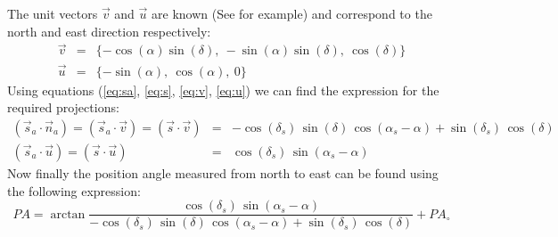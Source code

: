 The unit vectors $\vec{v}$ and $\vec{u}$ are known (See \cite{kn:mor} for example) and correspond to the north and east direction respectively:
\begin{eqnarray}
\vec{v} & = & \{ -\cos(\alpha) \sin(\delta),\:
                -\sin(\alpha) \sin(\delta), \:
                \cos(\delta)\}
\label{eq:v}
\\
\vec{u} & = & \{ -\sin(\alpha),\:  \cos(\alpha), \:  0\}
\label{eq:u}
\end{eqnarray}
Using equations (\ref{eq:sa}, \ref{eq:s}, \ref{eq:v}, \ref{eq:u}) we can find the expression for the required projections:
\begin{eqnarray}
(\vec {s}_a\cdot\vec{n}_a) =  (\vec {s}_a\cdot\vec{v}) =
(\vec{s}\cdot\vec{v})
& = & -\cos(\delta_s) \, \sin(\delta)\, \cos(\alpha_s-\alpha) +
 \sin(\delta_s) \, \cos(\delta)
\label{eq:sv}
\\
(\vec {s}_a\cdot\vec{u}) = (\vec{s}\cdot\vec{u})
& = & \cos(\delta_s) \, \sin(\alpha_s-\alpha)
\label{eq:su}
\end{eqnarray}
Now finally the position angle measured from north to east can be found using the following expression:
\begin{equation}
    PA = \arctan \frac
{\cos(\delta_s) \, \sin(\alpha_s-\alpha)}
{-\cos(\delta_s) \, \sin(\delta)\, \cos(\alpha_s-\alpha) +
 \sin(\delta_s) \, \cos(\delta)} + PA_{\circ}
\label{eq:paf}
\end{equation}

